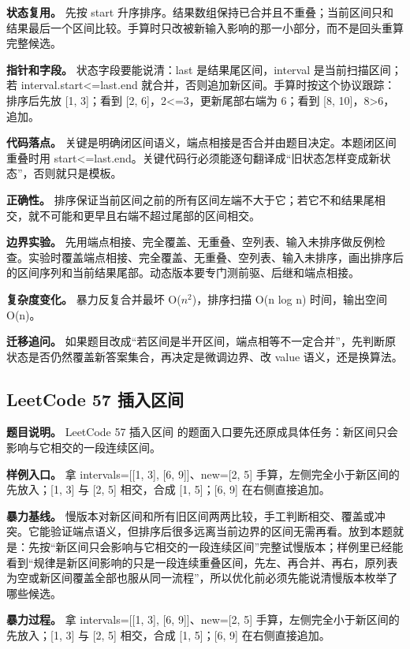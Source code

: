 \textbf{状态复用。} 先按 start 升序排序。结果数组保持已合并且不重叠；当前区间只和结果最后一个区间比较。手算时只改被新输入影响的那一小部分，而不是回头重算完整候选。

\textbf{指针和字段。} 状态字段要能说清：last 是结果尾区间，interval 是当前扫描区间；若 interval.start<=last.end 就合并，否则追加新区间。手算时按这个协议跟踪：排序后先放 [1, 3]；看到 [2, 6]，2<=3，更新尾部右端为 6；看到 [8, 10]，8>6，追加。

\textbf{代码落点。} 关键是明确闭区间语义，端点相接是否合并由题目决定。本题闭区间重叠时用 start<=last.end。关键代码行必须能逐句翻译成“旧状态怎样变成新状态”，否则就只是模板。

\textbf{正确性。} 排序保证当前区间之前的所有区间左端不大于它；若它不和结果尾相交，就不可能和更早且右端不超过尾部的区间相交。

\textbf{边界实验。} 先用端点相接、完全覆盖、无重叠、空列表、输入未排序做反例检查。实验时覆盖端点相接、完全覆盖、无重叠、空列表、输入未排序，画出排序后的区间序列和当前结果尾部。动态版本要专门测前驱、后继和端点相接。

\textbf{复杂度变化。} 暴力反复合并最坏 O(\ensuremath{n^{2}})，排序扫描 O(n log n) 时间，输出空间 O(n)。

\textbf{迁移追问。} 如果题目改成“若区间是半开区间，端点相等不一定合并”，先判断原状态是否仍然覆盖新答案集合，再决定是微调边界、改 value 语义，还是换算法。

\subsection{LeetCode 57 插入区间}

\textbf{题目说明。} LeetCode 57 插入区间 的题面入口要先还原成具体任务：新区间只会影响与它相交的一段连续区间。

\textbf{样例入口。} 拿 intervals=[[1, 3], [6, 9]]、new=[2, 5] 手算，左侧完全小于新区间的先放入；[1, 3] 与 [2, 5] 相交，合成 [1, 5]；[6, 9] 在右侧直接追加。

\textbf{暴力基线。} 慢版本对新区间和所有旧区间两两比较，手工判断相交、覆盖或冲突。它能验证端点语义，但排序后很多远离当前边界的区间无需再看。放到本题就是：先按“新区间只会影响与它相交的一段连续区间”完整试慢版本；样例里已经能看到“规律是新区间影响的只是一段连续重叠区间，先左、再合并、再右，原列表为空或新区间覆盖全部也服从同一流程”，所以优化前必须先能说清慢版本枚举了哪些候选。

\textbf{暴力过程。} 拿 intervals=[[1, 3], [6, 9]]、new=[2, 5] 手算，左侧完全小于新区间的先放入；[1, 3] 与 [2, 5] 相交，合成 [1, 5]；[6, 9] 在右侧直接追加。


